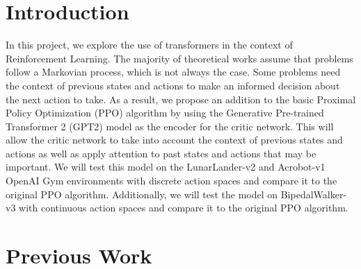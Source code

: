 \section{Introduction}
In this project, we explore the use of transformers in the context of Reinforcement Learning. The majority of theoretical works
assume that problems follow a Markovian process, which is not always the case. Some problems need the context of previous states and actions
to make an informed decision about the next action to take. As a result, we propose an addition to the basic Proximal Policy Optimization (PPO) algorithm
by using the Generative Pre-trained Transformer 2 (GPT2) model as the encoder for the critic network. This will allow the critic network to
take into account the context of previous states and actions as well as apply attention to past states and actions that may be important.
We will test this model on the LunarLander-v2 and Acrobot-v1 OpenAI Gym environments with discrete action spaces and compare it to the original PPO algorithm.
Additionally, we will test the model on BipedalWalker-v3 with continuous action spaces and compare it to the original PPO algorithm.



\section{Previous Work}


